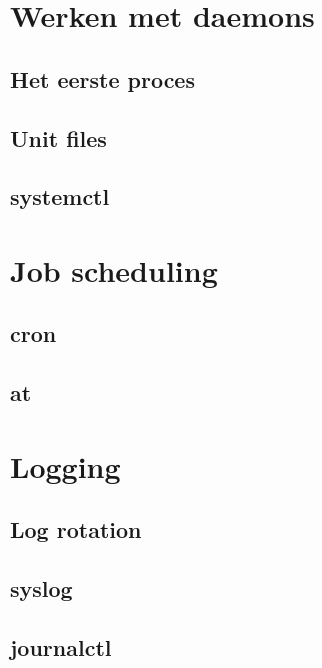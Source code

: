\documentclass[a4paper,12pt,twoside,openright,titlepage]{book}
\begin{document}
\chapter{Werken met daemons}

\section{Het eerste proces}

\section{Unit files}

\section{systemctl}


\chapter{Job scheduling}

\section{cron}

\section{at}

\chapter{Logging}

\section{Log rotation}\label{sec:logrotate}

\section{syslog}\label{sec:syslog}


\section{journalctl}\label{sec:journalctl}

\end{document}
